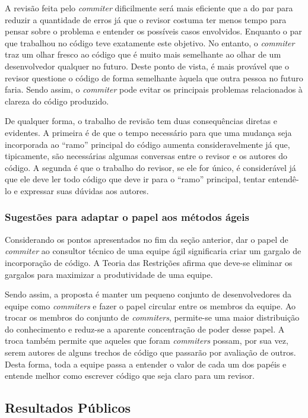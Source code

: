 A revisão feita pelo \emph{commiter} dificilmente será mais eficiente
que a do par para reduzir a quantidade de erros já que o revisor
costuma ter menos tempo para pensar sobre o problema e entender os
possíveis casos envolvidos. Enquanto o par que trabalhou no código
teve exatamente este objetivo. No entanto, o \emph{commiter} traz um
olhar fresco ao código que é muito mais semelhante ao olhar de um
desenvolvedor qualquer no futuro. Deste ponto de vista, é mais
provável que o revisor questione o código de forma semelhante àquela
que outra pessoa no futuro faria. Sendo assim, o \emph{commiter} pode
evitar os principais problemas relacionados à clareza do código
produzido.

De qualquer forma, o trabalho de revisão tem duas consequências
diretas e evidentes. A primeira é de que o tempo necessário para que
uma mudança seja incorporada ao ``ramo'' principal do código aumenta
consideravelmente já que, tipicamente, são necessárias algumas
conversas entre o revisor e os autores do código. A segunda é que o
trabalho do revisor, se ele for único, é considerável já que ele deve
ler todo código que deve ir para o ``ramo'' principal, tentar
entendê-lo e expressar suas dúvidas aos autores.

\subsubsection{Sugestões para adaptar o papel aos métodos ágeis}

Considerando os pontos apresentados no fim da seção anterior, dar o
papel de \emph{commiter} ao consultor técnico de uma equipe ágil
significaria criar um gargalo de incorporação de código. A Teoria das
Restrições \cite{goldratt84} afirma que deve-se eliminar os gargalos
para maximizar a produtividade de uma equipe.

Sendo assim, a proposta é manter um pequeno conjunto de
desenvolvedores da equipe como \emph{commiters} e fazer o papel
circular entre os membros da equipe. Ao trocar os membros do conjunto
de \emph{commiters}, permite-se uma maior distribuição do conhecimento
e reduz-se a aparente concentração de poder desse papel. A troca
também permite que aqueles que foram \emph{commiters} possam, por sua
vez, serem autores de alguns trechos de código que passarão por
avaliação de outros. Desta forma, toda a equipe passa a entender o
valor de cada um dos papéis e entende melhor como escrever código que
seja claro para um revisor.

\subsection{Resultados Públicos}
\label{subsec:publicity}

